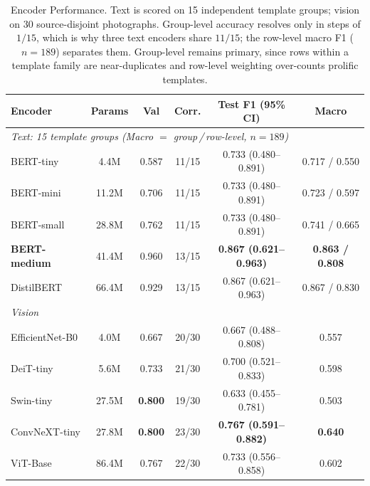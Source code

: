 \documentclass[conference]{IEEEtran}
\begin{document}
\begin{table}[t]
\caption{Encoder Performance. Text is scored on 15 independent template groups; vision on 30 source-disjoint photographs. Group-level accuracy resolves only in steps of $1/15$, which is why three text encoders share $11/15$; the row-level macro F1 ($n{=}189$) separates them. Group-level remains primary, since rows within a template family are near-duplicates and row-level weighting over-counts prolific templates.}
\label{tab:encoders}
\centering\footnotesize
\setlength\tabcolsep{2.6pt}
\begin{tabular}{lccccc}
\toprule
\textbf{Encoder} & \textbf{Params} & \textbf{Val} & \textbf{Corr.} & \textbf{Test F1 (95\% CI)} & \textbf{Macro}\\
\midrule
\multicolumn{6}{l}{\textit{Text: 15 template groups (Macro $=$ group\,/\,row-level, $n{=}189$)}}\\
BERT-tiny     & 4.4M  & 0.587 & 11/15 & 0.733 (0.480--0.891) & 0.717 / 0.550 \\
BERT-mini     & 11.2M & 0.706 & 11/15 & 0.733 (0.480--0.891) & 0.723 / 0.597 \\
BERT-small    & 28.8M & 0.762 & 11/15 & 0.733 (0.480--0.891) & 0.741 / 0.665 \\
\textbf{BERT-medium} & 41.4M & 0.960 & 13/15 & \textbf{0.867 (0.621--0.963)} & \textbf{0.863 / 0.808} \\
DistilBERT    & 66.4M & 0.929 & 13/15 & 0.867 (0.621--0.963) & 0.867 / 0.830 \\
\midrule
\multicolumn{6}{l}{\textit{Vision}}\\
EfficientNet-B0 & 4.0M  & 0.667 & 20/30 & 0.667 (0.488--0.808) & 0.557 \\
DeiT-tiny       & 5.6M  & 0.733 & 21/30 & 0.700 (0.521--0.833) & 0.598 \\
Swin-tiny       & 27.5M & \textbf{0.800} & 19/30 & 0.633 (0.455--0.781) & 0.503 \\
ConvNeXT-tiny   & 27.8M & \textbf{0.800} & 23/30 & \textbf{0.767 (0.591--0.882)} & \textbf{0.640} \\
ViT-Base        & 86.4M & 0.767 & 22/30 & 0.733 (0.556--0.858) & 0.602 \\
\bottomrule
\end{tabular}
\end{table}
\end{document}
